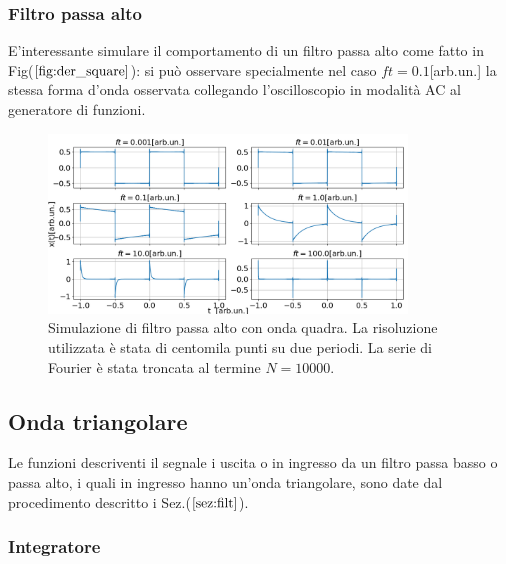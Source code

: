\documentclass{article}
\begin{document}
            \subsubsection{Filtro passa alto}
                E'interessante simulare il comportamento di un filtro passa alto 
                come fatto in Fig($\ref{fig:der_square}$): si  può osservare specialmente 
                nel caso $ft=0.1$[arb.un.] la stessa forma d'onda osservata collegando 
                l'oscilloscopio in modalità AC al generatore di funzioni.
                    \begin{figure}[H]
                        \centering
                        \includegraphics[width=0.85\textwidth]{der_square.png} %
                        \caption{Simulazione di filtro passa alto con onda quadra.
                        La risoluzione utilizzata è stata di centomila punti su due periodi.
                        La serie di Fourier è stata troncata al termine $N=10000$.}
                        \label{fig:der_square}
                    \end{figure}


    \subsection{Onda triangolare}
    Le funzioni descriventi il segnale i uscita o in ingresso da un filtro passa basso
    o passa alto, i quali in ingresso hanno un'onda triangolare, 
    sono date dal procedimento descritto i Sez.($\ref{sez:filt}$).
        \subsubsection{Integratore}
            
\end{document}
